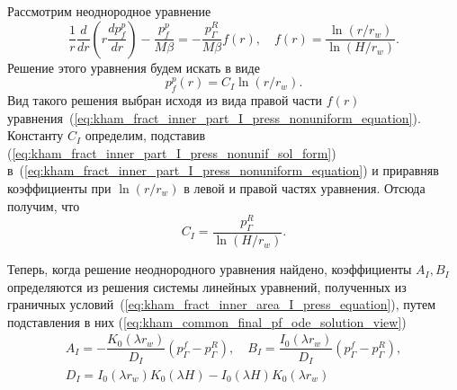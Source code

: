 \documentclass{article}
\begin{document}
Рассмотрим неоднородное уравнение
\begin{equation}
	\displaystyle
	\dfrac{1}{r}\dfrac{d}{dr}\left(r\dfrac{d p_f^p}{dr}\right) - \dfrac{p_f^p}{M \beta} = - \dfrac{p^R_{\Gamma}}{M \beta}  f\left(r\right), \quad
	f\left(r\right) = \dfrac{\ln{\left(r/r_w\right)}}{\ln{\left(H/r_w\right)}}.
	\label{eq:kham_fract_inner_part_I_press_nonuniform_equation}
\end{equation}
Решение этого уравнения будем искать в виде
\begin{equation}
	\displaystyle
	p_f^p\left(r\right) = C_I \ln\left(r/r_w\right).
	\label{eq:kham_fract_inner_part_I_press_nonunif_sol_form}
\end{equation}
Вид такого решения выбран исходя из вида правой части $f\left(r\right)$ уравнения~(\ref{eq:kham_fract_inner_part_I_press_nonuniform_equation}).
Константу $C_I$ определим, подставив (\ref{eq:kham_fract_inner_part_I_press_nonunif_sol_form}) в~(\ref{eq:kham_fract_inner_part_I_press_nonuniform_equation})
и приравняв коэффициенты при $\ln\left(r/r_w\right)$ в левой и правой частях уравнения. Отсюда получим, что
\begin{equation}
	\displaystyle
	C_I = \dfrac{p^R_{\Gamma}}{\ln{\left(H/r_w\right)}}.
	\label{eq:kham_fract_inner_part_I_sol_nonunif_c_cf}
\end{equation}

Теперь, когда решение неоднородного уравнения найдено, коэффициенты $A_{I}, B_I$ определяются из решения системы
линейных уравнений, полученных из граничных условий~(\ref{eq:kham_fract_inner_area_I_press_equation}), путем подставления
в них (\ref{eq:kham_common_final_pf_ode_solution_view})
\begin{equation}
	\displaystyle
	\begin{gathered}
		A_I = - \dfrac{K_0 \left(\lambda r_w\right)}{D_I} \left(p^f_{\Gamma} - p^R_{\Gamma}\right), \quad
		B_I = \dfrac{I_0 \left(\lambda r_w\right)}{D_I} \left(p^f_{\Gamma} - p^R_{\Gamma}\right), \\[6pt]
		D_I = I_0 \left(\lambda r_w \right)K_0\left(\lambda H\right) - I_0\left(\lambda H\right) K_0\left(\lambda r_w\right)
	\end{gathered}
	\label{eq:kham_fract_inner_part_I_ab_sol}
\end{equation}
\end{document}
